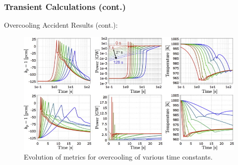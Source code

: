 \begin{frame}
        \frametitle{Transient Calculations (cont.)}
                Overcooling Accident Results (cont.):
                \begin{figure}[htbp!]
                        \begin{center}
                        \includegraphics[scale=0.5]{JC-Oct16/overcooling-time.jpg}
                        \end{center}
                        \caption{Evolution of metrics for overcooling of various time constants.}
                        \label{fig:overcool-time}
                \end{figure}
        
        
\end{frame}

